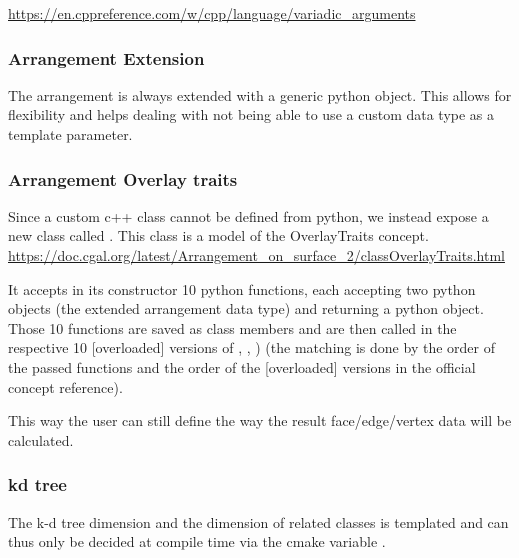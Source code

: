 \url{https://en.cppreference.com/w/cpp/language/variadic_arguments}

\subsubsection{Arrangement Extension}
\label{sec:bind:code:ae}
The arrangement is always extended with a generic python object. This
allows for flexibility and helps dealing with not being able to use a
custom data type as a template parameter.

\subsubsection{Arrangement Overlay traits}
\label{sec:bind:code:overlay}
Since a custom c++  class cannot be
defined from python, we instead expose a new class called
. This class is a model of the
OverlayTraits concept.
\url{https://doc.cgal.org/latest/Arrangement_on_surface_2/classOverlayTraits.html}

It accepts in its constructor 10 python functions, each accepting two
python objects (the extended arrangement data type) and returning a
python object. Those 10 functions are saved as class members and are
then called in the respective 10 [overloaded] versions of
, ,
) (the matching is done by
the order of the passed functions and the order of the [overloaded]
versions in the official concept reference).

This way the user can still define the way the result face/edge/vertex
data will be calculated.

\subsubsection{kd tree}
\label{sec:bind:code:kdtree}
The k-d tree dimension and the dimension of related classes is
templated and can thus only be decided at compile time via the cmake
variable .

